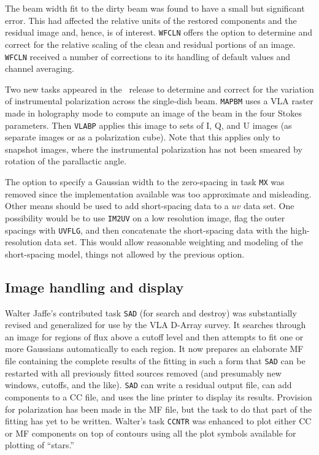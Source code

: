 The beam width fit to the dirty beam was found to have a small but
significant error.  This had affected the relative units of the
restored components and the residual image and, hence, is of interest.
{\tt WFCLN} offers the option to determine and correct for the
relative scaling of the clean and residual portions of an image.  {\tt
WFCLN} received a number of corrections to its handling of default
values and channel averaging.

Two new tasks appeared in the \RELEASENAME\ release to determine and
correct for the variation of instrumental polarization across the
single-dish beam.  {\tt MAPBM} uses a VLA raster made in holography
mode to compute an image of the beam in the four Stokes parameters.
Then {\tt VLABP} applies this image to sets of I, Q, and U images (as
separate images or as a polarization cube).  Note that this applies
only to snapshot images, where the instrumental polarization has not
been smeared by rotation of the parallactic angle.

The option to specify a Gaussian width to the zero-spacing in task
{\tt MX} was removed since the implementation available was too
approximate and misleading.  Other means should be used to add
short-spacing data to a $uv$ data set.  One possibility would be to
use {\tt IM2UV} on a low resolution image, flag the outer spacings with
{\tt UVFLG}, and then concatenate the short-spacing data with the
high-resolution data set.  This would allow reasonable weighting and
modeling of the short-spacing model, things not allowed by the
previous option.

\subsection{Image handling and display}

Walter Jaffe's contributed task {\tt SAD} (for search and destroy) was
substantially revised and generalized for use by the VLA D-Array
survey.  It searches through an image for regions of flux above a
cutoff level and then attempts to fit one or more Gaussians
automatically to each region.  It now prepares an elaborate MF file
containing the complete results of the fitting in such a form that
{\tt SAD} can be restarted with all previously fitted sources removed
(and presumably new windows, cutoffs, and the like).  {\tt SAD} can
write a residual output file, can add components to a CC file, and
uses the line printer to display its results.  Provision for
polarization has been made in the MF file, but the task to do that
part of the fitting has yet to be written.  Walter's task {\tt CCNTR}
was enhanced to plot either CC or MF components on top of contours using
all the plot symbols available for plotting of ``stars.''

